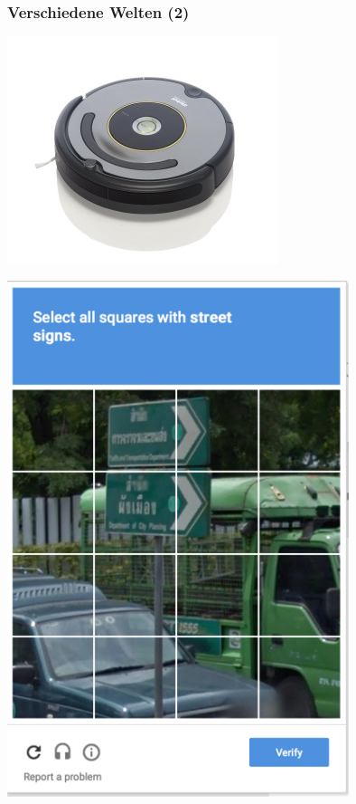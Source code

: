 \documentclass[aspectratio=43,x11names]{beamer}
\begin{document}
\begin{frame}[fragile]
\frametitle{Verschiedene Welten (2)}

\begin{minipage}{0.45\textwidth}
\begin{center}
\includegraphics[width=\textwidth]{images/roomba} 
\end{center}
\end{minipage}
\begin{minipage}{0.45\textwidth}
\begin{center}
\includegraphics[width=0.75\textwidth]{images/recaptcha}
\end{center}
\end{minipage}

\end{frame}
\end{document}
